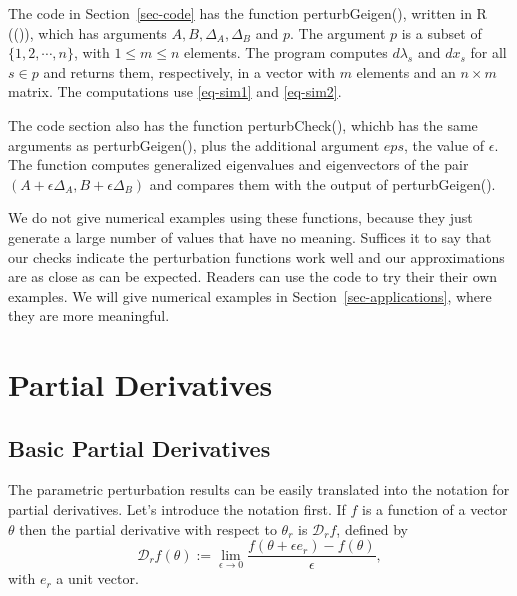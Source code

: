 \documentclass[
  12pt,
  letterpaper,
  DIV=11,
  numbers=noendperiod]{scrartcl}
\newcommand{\sectionbreak}{\clearpage}
\begin{document}
The code in Section~\ref{sec-code} has the function perturbGeigen(),
written in R
(()), which
has arguments \(A, B, \Delta_A,\Delta_B\) and \(p\). The argument \(p\)
is a subset of \(\{1,2,\cdots,n\}\), with \(1\leq m\leq n\) elements.
The program computes \(d\lambda_s\) and \(dx_s\) for all \(s\in p\) and
returns them, respectively, in a vector with \(m\) elements and an
\(n\times m\) matrix. The computations use \eqref{eq-sim1} and
\eqref{eq-sim2}.

The code section also has the function perturbCheck(), whichb has the
same arguments as perturbGeigen(), plus the additional argument \(eps\),
the value of \(\epsilon\). The function computes generalized eigenvalues
and eigenvectors of the pair
\((A+\epsilon\Delta_A, B+\epsilon\Delta_B)\) and compares them with the
output of perturbGeigen().

We do not give numerical examples using these functions, because they
just generate a large number of values that have no meaning. Suffices it
to say that our checks indicate the perturbation functions work well and
our approximations are as close as can be expected. Readers can use the
code to try their their own examples. We will give numerical examples in
Section~\ref{sec-applications}, where they are more meaningful.

\sectionbreak

\section{Partial Derivatives}\label{sec-partial}

\subsection{Basic Partial Derivatives}\label{sec-parbasic}

The parametric perturbation results can be easily translated into the
notation for partial derivatives. Let's introduce the notation first. If
\(f\) is a function of a vector \(\theta\) then the partial derivative
with respect to \(\theta_r\) is \(\mathcal{D}_rf\), defined by
\begin{equation}
\mathcal{D}_rf(\theta):=\lim_{\epsilon\rightarrow 0}\frac{f(\theta+\epsilon e_r)-f(\theta)}{\epsilon},\label{eq-parderdef}
\end{equation} with \(e_r\) a unit vector.
\end{document}
